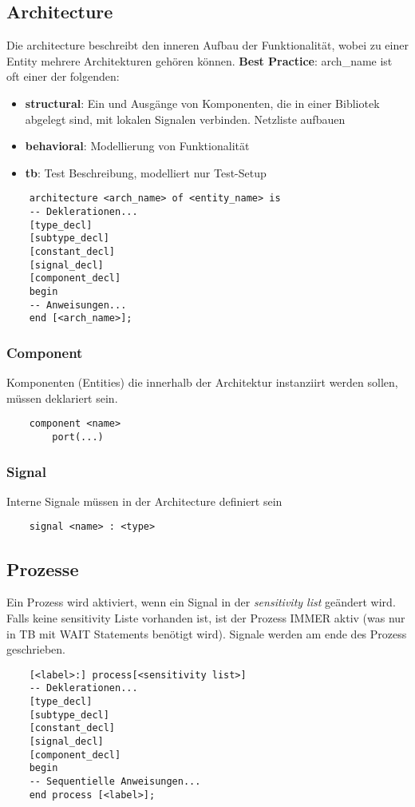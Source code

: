 \subsection{Architecture}
Die architecture beschreibt den inneren Aufbau der Funktionalität, wobei zu einer Entity mehrere Architekturen gehören können. \textbf{Best Practice}: arch\_name ist oft einer der folgenden:
\begin{itemize}[nosep]
	\item \textbf{structural}: Ein und Ausgänge von Komponenten, die in einer Bibliotek abgelegt sind, mit lokalen Signalen verbinden. Netzliste aufbauen
	\item \textbf{behavioral}: Modellierung von Funktionalität
	\item \textbf{tb}: Test Beschreibung, modelliert nur Test-Setup
\end{itemize}

\begin{lstlisting}
	architecture <arch_name> of <entity_name> is
	-- Deklerationen...
	[type_decl]
	[subtype_decl]
	[constant_decl]
	[signal_decl]
	[component_decl]
	begin
	-- Anweisungen...
	end [<arch_name>];
\end{lstlisting}

\subsubsection{Component}
Komponenten (Entities) die innerhalb der Architektur instanziirt werden sollen, müssen deklariert sein.
\begin{lstlisting}
	component <name>
		port(...)
\end{lstlisting}

\subsubsection{Signal}
Interne Signale müssen in der Architecture definiert sein
\begin{lstlisting}
	signal <name> : <type>
\end{lstlisting}

\subsection{Prozesse}
Ein Prozess wird aktiviert, wenn ein Signal in der \textit{sensitivity list} geändert wird. Falls keine sensitivity Liste vorhanden ist, ist der Prozess IMMER aktiv (was nur in TB mit WAIT Statements benötigt wird). Signale werden am ende des Prozess geschrieben. 
\begin{lstlisting}
	[<label>:] process[<sensitivity list>]
	-- Deklerationen...
	[type_decl]
	[subtype_decl]
	[constant_decl]
	[signal_decl]
	[component_decl]
	begin
	-- Sequentielle Anweisungen...
	end process [<label>];
\end{lstlisting}

